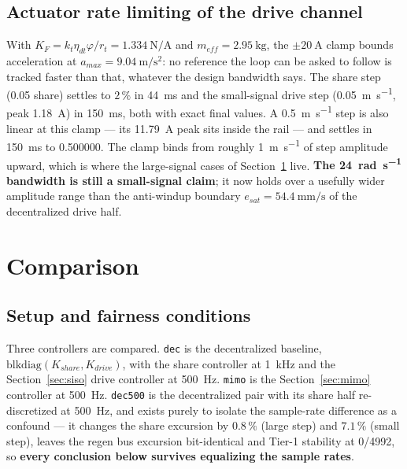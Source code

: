 \documentclass[energies,article,submit,pdftex,oneauthor]{Definitions/mdpi}
\begin{document}
\subsection{Actuator rate limiting of the drive channel}
With $K_F = k_t\eta_{dt}\varphi/r_t = \SI{1.334}{\newton\per\ampere}$ and
$m_{\!e\!f\!f} = \SI{2.95}{\kilo\gram}$, the $\pm\SI{20}{\ampere}$ clamp bounds acceleration at
$a_{max} = \SI{9.04}{\meter\per\second\squared}$: no reference the loop can be asked to follow is
tracked faster than that, whatever the design bandwidth says. The share step (0.05 share) settles
to $2\,\%$ in \SI{44}{\milli\second} and the small-signal drive step
(\SI{0.05}{\meter\per\second}, peak \SI{1.18}{\ampere}) in \SI{150}{\milli\second}, both with
exact final values. A \SI{0.5}{\meter\per\second} step is also linear at this clamp --- its
\SI{11.79}{\ampere} peak sits inside the rail --- and settles in \SI{150}{\milli\second} to
\num{0.500000}. The clamp binds from roughly \SI{1}{\meter\per\second} of step amplitude upward,
which is where the large-signal cases of Section~\ref{sec:comparison} live. \textbf{The
\SI{24}{\radian\per\second} bandwidth is still a small-signal claim}; it now holds over a usefully
wider amplitude range than the anti-windup boundary
$e_{sat} = \SI{54.4}{\milli\meter\per\second}$ of the decentralized drive half.

\section{Comparison}
\label{sec:comparison}

\subsection{Setup and fairness conditions}
\label{sec:fairness}

Three controllers are compared. \texttt{dec} is the decentralized baseline,
$\mathrm{blkdiag}(K_{share}, K_{drive})$, with the share controller at \SI{1}{\kilo\hertz} and
the Section~\ref{sec:siso} drive controller at \SI{500}{\hertz}. \texttt{mimo} is the
Section~\ref{sec:mimo} controller at \SI{500}{\hertz}. \texttt{dec500} is the decentralized pair
with its share half re-discretized at \SI{500}{\hertz}, and exists purely to isolate the
sample-rate difference as a confound --- it changes the share excursion by $0.8\,\%$ (large step)
and $7.1\,\%$ (small step), leaves the regen bus excursion bit-identical and Tier-1 stability at
0/4992, so \textbf{every conclusion below survives equalizing the sample rates}.
\end{document}
